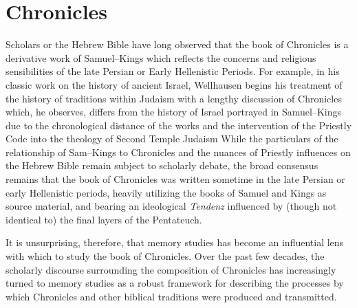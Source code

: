 \chapter{Chronicles}\label{chronicles}

Scholars or the Hebrew Bible have long observed that the book of
Chronicles is a derivative work of Samuel--Kings which reflects the
concerns and religious sensibilities of the late Persian or Early
Hellenistic Periods. For example, in his classic work on the history of
ancient Israel, Wellhausen begins his treatment of the history of
traditions within Judaism with a lengthy discussion of Chronicles which,
he observes, differs from the history of Israel portrayed in
Samuel--Kings due to the chronological distance of the works and the
intervention of the Priestly Code into the theology of Second Temple
Judaism\autocite[171--172]{wellhausen1957} While the particulars of the
relationship of Sam--Kings to Chronicles and the nuances of Priestly
influences on the Hebrew Bible remain subject to scholarly debate, the
broad consensus remains that the book of Chronicles was written sometime
in the late Persian or early Hellenistic periods, heavily utilizing the
books of Samuel and Kings as source material, and bearing an ideological
\emph{Tendenz} influenced by (though not identical to) the final layers
of the Pentateuch.\autocites[For a thorough and reasonably recent
summary of the \emph{status questionis}, see][72--89]{knoppers2003}[See
also][]{japhet1993}{japhet2009}{braun1986}[and][]{coggins1976}

It is unsurprising, therefore, that memory studies has become an
influential lens with which to study the book of Chronicles. Over the
past few decades, the scholarly discourse surrounding the composition of
Chronicles has increasingly turned to memory studies as a robust
framework for describing the processes by which Chronicles and other
biblical traditions were produced and
transmitted.\autocites{benzvi2017}[148--166]{wright2014}{blenkinsopp2013}{benzvi-a_evans-williams2013}{benzvi-b_evans-williams2013}
